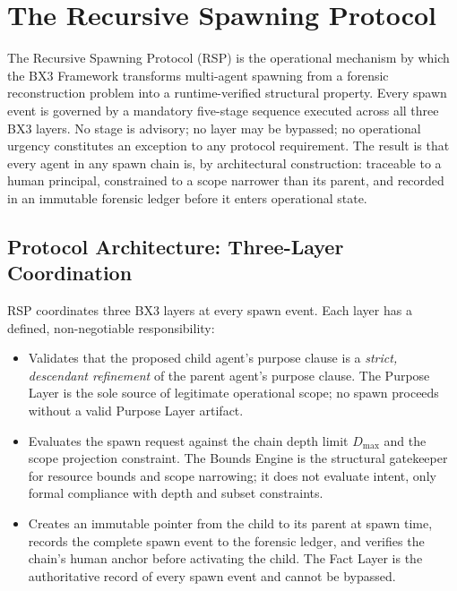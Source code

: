 \section{The Recursive Spawning Protocol}
\label{sec:rs-protocol}

The Recursive Spawning Protocol (RSP) is the operational mechanism by which the BX3 Framework transforms multi-agent spawning from a forensic reconstruction problem into a runtime-verified structural property. Every spawn event is governed by a mandatory five-stage sequence executed across all three BX3 layers. No stage is advisory; no layer may be bypassed; no operational urgency constitutes an exception to any protocol requirement. The result is that every agent in any spawn chain is, by architectural construction: traceable to a human principal, constrained to a scope narrower than its parent, and recorded in an immutable forensic ledger before it enters operational state.

\subsection{Protocol Architecture: Three-Layer Coordination}

RSP coordinates three BX3 layers at every spawn event. Each layer has a defined, non-negotiable responsibility:

\begin{itemize}
  \item[\textbf{Purpose Layer.}] Validates that the proposed child agent's purpose clause is a \textit{strict, descendant refinement} of the parent agent's purpose clause. The Purpose Layer is the sole source of legitimate operational scope; no spawn proceeds without a valid Purpose Layer artifact.

  \item[\textbf{Bounds Engine.}] Evaluates the spawn request against the chain depth limit $D_{\max}$ and the scope projection constraint. The Bounds Engine is the structural gatekeeper for resource bounds and scope narrowing; it does not evaluate intent, only formal compliance with depth and subset constraints.

  \item[\textbf{Fact Layer.}] Creates an immutable pointer from the child to its parent at spawn time, records the complete spawn event to the forensic ledger, and verifies the chain's human anchor before activating the child. The Fact Layer is the authoritative record of every spawn event and cannot be bypassed.
\end{itemize}


